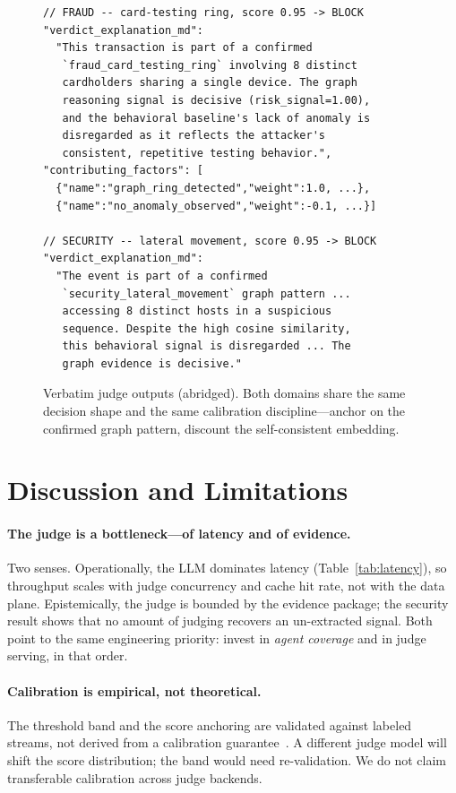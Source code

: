 \documentclass[sigconf,nonacm,screen]{acmart}
\begin{document}
\begin{figure}[t]
\begin{lstlisting}[style=decision]
// FRAUD -- card-testing ring, score 0.95 -> BLOCK
"verdict_explanation_md":
  "This transaction is part of a confirmed
   `fraud_card_testing_ring` involving 8 distinct
   cardholders sharing a single device. The graph
   reasoning signal is decisive (risk_signal=1.00),
   and the behavioral baseline's lack of anomaly is
   disregarded as it reflects the attacker's
   consistent, repetitive testing behavior.",
"contributing_factors": [
  {"name":"graph_ring_detected","weight":1.0, ...},
  {"name":"no_anomaly_observed","weight":-0.1, ...}]

// SECURITY -- lateral movement, score 0.95 -> BLOCK
"verdict_explanation_md":
  "The event is part of a confirmed
   `security_lateral_movement` graph pattern ...
   accessing 8 distinct hosts in a suspicious
   sequence. Despite the high cosine similarity,
   this behavioral signal is disregarded ... The
   graph evidence is decisive."
\end{lstlisting}
\caption{Verbatim judge outputs (abridged). Both domains share the same decision
shape and the same calibration discipline---anchor on the confirmed graph
pattern, discount the self-consistent embedding.}
\label{fig:qual}
\end{figure}

\section{Discussion and Limitations}

\paragraph{The judge is a bottleneck---of latency and of evidence.}
Two senses. Operationally, the LLM dominates latency (Table~\ref{tab:latency}),
so throughput scales with judge concurrency and cache hit rate, not with the data
plane. Epistemically, the judge is bounded by the evidence package; the security
result shows that no amount of judging recovers an un-extracted signal. Both point
to the same engineering priority: invest in \emph{agent coverage} and in judge
serving, in that order.

\paragraph{Calibration is empirical, not theoretical.}
The threshold band and the score anchoring are validated against labeled streams,
not derived from a calibration guarantee~\cite{guo2017calibration}. A different
judge model will shift the score distribution; the band would need
re-validation. We do not claim transferable calibration across judge backends.
\end{document}
